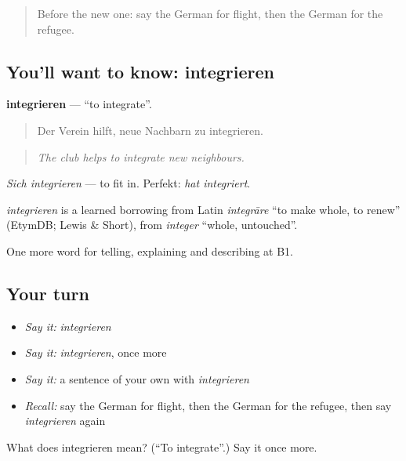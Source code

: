 \begin{quote}
Before the new one: say the German for flight, then the German for the refugee.
\end{quote}

\subsection*{You'll want to know: integrieren}
\textbf{integrieren} — \textquotedblleft{}to integrate\textquotedblright{}.

\begin{quote}
Der Verein hilft, neue Nachbarn zu integrieren.
\end{quote}

\begin{quote}
\emph{The club helps to integrate new neighbours.}
\end{quote}

\emph{Sich integrieren} — to fit in. Perfekt: \emph{hat integriert}.

\begin{cousinweb}
\emph{integrieren} is a learned borrowing from Latin \emph{integrāre} \textquotedblleft{}to make whole, to renew\textquotedblright{} (EtymDB; Lewis \& Short), from \emph{integer} \textquotedblleft{}whole, untouched\textquotedblright{}.
\end{cousinweb}

\begin{grammarlens}[title={What you've built}]
One more word for telling, explaining and describing at B1.
\end{grammarlens}

\subsection*{Your turn}
\begin{itemize}
\raggedright
  \item \emph{Say it:} \emph{integrieren}
  \item \emph{Say it:} \emph{integrieren}, once more
  \item \emph{Say it:} a sentence of your own with \emph{integrieren}
  \item \emph{Recall:} say the German for flight, then the German for the refugee, then say \emph{integrieren} again
\end{itemize}

\begin{tcolorbox}[breakable,colback=teal!4,colframe=teal!35!black,title={Before you move on}]
What does integrieren mean? (\textquotedblleft{}To integrate\textquotedblright{}.) Say it once more.
\end{tcolorbox}
